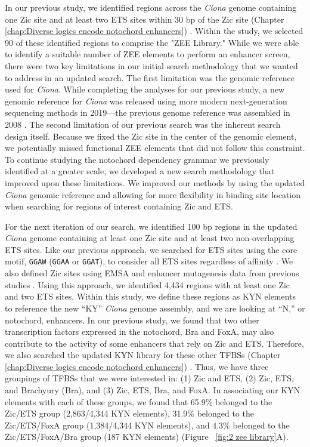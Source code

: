 In our previous study, we identified regions across the \textit{Ciona} genome containing one Zic site and at least two ETS sites within 30 bp of the Zic site (Chapter \ref{chap:Diverse logics encode notochord enhancers}) \cite{song2022,farley2016}. Within the study, we selected 90 of these identified regions to comprise the "ZEE Library." While we were able to identify a suitable number of ZEE elements to perform an enhancer screen, there were two key limitations in our initial search methodology that we wanted to address in an updated search. The first limitation was the genomic reference used for \textit{Ciona}. While completing the analyses for our previous study, a new genomic reference for \textit{Ciona} was released using more modern next-generation sequencing methods in 2019—the previous genome reference was assembled in 2008 \cite{satou2019,dehal2002}. The second limitation of our previous search was the inherent search design itself. Because we fixed the Zic site in the center of the genomic element, we potentially missed functional ZEE elements that did not follow this constraint. To continue studying the notochord dependency grammar we previously identified at a greater scale, we developed a new search methodology that improved upon these limitations. We improved our methods by using the updated \textit{Ciona} genomic reference and allowing for more flexibility in binding site location when searching for regions of interest containing Zic and ETS. 

For the next iteration of our search, we identified 100 bp regions in the updated \textit{Ciona} genome containing at least one Zic site and at least two non-overlapping ETS sites. Like our previous approach, we searched for ETS sites using the core motif, \verb|GGAW| (\verb|GGAA| or \verb|GGAT|), to consider all ETS sites regardless of affinity \cite{lamber2008,wei2010,song2022}. We also defined Zic sites using EMSA and enhancer mutagenesis data from previous studies \cite{matsumoto2007a,takahashi1999,yagi2004,song2022}. Using this approach, we identified 4,434 regions with at least one Zic and two ETS sites. Within this study, we define these regions as KYN elements to reference the new “KY” \textit{Ciona} genome assembly, and we are looking at “N,” or notochord, enhancers. In our previous study, we found that two other transcription factors expressed in the notochord, Bra and FoxA, may also contribute to the activity of some enhancers that rely on Zic and ETS. Therefore, we also searched the updated KYN library for these other TFBSs (Chapter \ref{chap:Diverse logics encode notochord enhancers}) \cite{song2022}. Thus, we have three groupings of TFBSs that we were interested in: (1) Zic and ETS, (2) Zic, ETS, and Brachyury (Bra), and (3) Zic, ETS, Bra, and FoxA. In associating our KYN elements with each of these groups, we found that 65.9\% belonged to the Zic/ETS group (2,863/4,344 KYN elements), 31.9\% belonged to the Zic/ETS/FoxA group (1,384/4,344 KYN elements), and 4.3\% belonged to the Zic/ETS/FoxA/Bra group (187 KYN elements) (Figure ~\ref{fig:2 zee library}A). 

